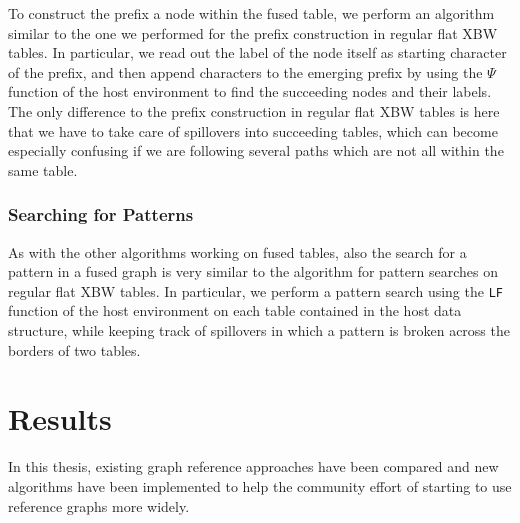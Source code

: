 \documentclass[a4paper,12pt,twoside,BCOR=10mm]{scrbook}
\begin{document}
To construct the prefix a node within the fused table,
we perform an algorithm similar to the one we performed for the prefix construction
in regular flat XBW tables.
In particular, we read out the label of the node itself as starting character of the prefix,
and then append characters to the emerging prefix by using the $\Psi$ function of the host environment to
find the succeeding nodes and their labels.
The only difference to the prefix construction in regular flat XBW tables
is here that we have to take care of spillovers into succeeding tables,
which can become especially confusing if we are following several paths which are not all
within the same table.


\subsection{Searching for Patterns}

As with the other algorithms working on fused tables, also the search for a pattern
in a fused graph is very similar to the algorithm for pattern searches on regular flat XBW tables.
In particular, we perform a pattern search using the \texttt{LF} function of the host environment on each table contained
in the host data structure, while keeping track of spillovers in which a pattern is broken
across the borders of two tables.


\chapter{Results}
%

In this thesis, existing graph reference approaches have been compared
and new algorithms have been implemented to help the community effort
of starting to use reference graphs more widely.
\end{document}
